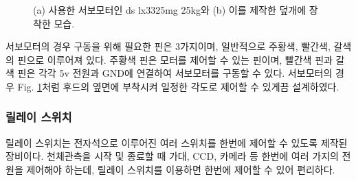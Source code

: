 \documentclass[twoside,11pt]{gshs_thesis}
\begin{document}
 \begin{figure}[h]
 	\begin{center}
 	\end{center}
 	\caption{(a) 사용한 서보모터인 ds lx3325mg 25kg와 (b) 이를 제작한 덮개에 장착한 모습.}
 	\label{motor}
 \end{figure}

 서보모터의 경우 구동을 위해 필요한 핀은 3가지이며, 일반적으로 주황색, 빨간색, 갈색의 핀으로 이루어져 있다. 주황색 핀은 모터를 제어할 수 있는 핀이며, 빨간색 핀과 갈색 핀은 각각 5v 전원과 GND에 연결하여 서보모터를 구동할 수 있다. 서보모터의 경우 Fig. \ref{motor}처럼 후드의 옆면에 부착시켜 일정한 각도로 제어할 수 있게끔 설계하였다.



\subsubsection{릴레이 스위치}

 릴레이 스위치는 전자석으로 이루어진 여러 스위치를 한번에 제어할 수 있도록 제작된 장비이다. 천체관측을 시작 및 종료할 때 가대, CCD, 카메라 등 한번에 여러 가지의 전원을 제어해야 하는데, 릴레이 스위치를 이용하면 한번에 제어할 수 있어 편리하다. 
\end{document}
